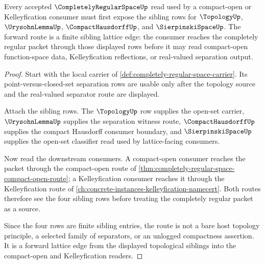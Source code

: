 \begin{theorem}
\label{thm:completely-regular-space-sibling-lattice-forward}
Every accepted $\CompletelyRegularSpaceUp$ read used by a compact-open or Kelleyfication consumer must first expose the sibling rows for $\TopologyUp$, $\UrysohnLemmaUp$, $\CompactHausdorffUp$, and $\SierpinskiSpaceUp$. The forward route is a finite sibling lattice edge: the consumer reaches the completely regular packet through those displayed rows before it may read compact-open function-space data, Kelleyfication reflections, or real-valued separation output.
\end{theorem}
\begin{proof}
Start with the local carrier of \autoref{def:completely-regular-space-carrier}. Its point-versus-closed-set separation rows are usable only after the topology source and the real-valued separator route are displayed.

Attach the sibling rows. The $\TopologyUp$ row supplies the open-set carrier, $\UrysohnLemmaUp$ supplies the separation witness route, $\CompactHausdorffUp$ supplies the compact Hausdorff consumer boundary, and $\SierpinskiSpaceUp$ supplies the open-set classifier read used by lattice-facing consumers.

Now read the downstream consumers. A compact-open consumer reaches the packet through the compact-open route of \autoref{thm:completely-regular-space-compact-open-route}; a Kelleyfication consumer reaches it through the Kelleyfication route of \autoref{ch:concrete-instances-kelleyfication-namecert}. Both routes therefore see the four sibling rows before treating the completely regular packet as a source.

Since the four rows are finite sibling entries, the route is not a bare host topology principle, a selected family of separators, or an unlogged compactness assertion. It is a forward lattice edge from the displayed topological siblings into the compact-open and Kelleyfication readers.
\end{proof}
